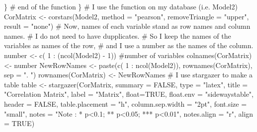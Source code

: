 \documentclass[12pt,]{article}
\newenvironment{Shaded}{}{}
\newcommand{\KeywordTok}[1]{\textcolor[rgb]{0.00,0.00,1.00}{#1}}
\newcommand{\DataTypeTok}[1]{#1}
\newcommand{\DecValTok}[1]{#1}
\newcommand{\StringTok}[1]{\textcolor[rgb]{0.00,0.50,0.50}{#1}}
\newcommand{\CommentTok}[1]{\textcolor[rgb]{0.00,0.50,0.00}{#1}}
\newcommand{\OtherTok}[1]{\textcolor[rgb]{1.00,0.25,0.00}{#1}}
\newcommand{\OperatorTok}[1]{#1}
\newcommand{\NormalTok}[1]{#1}
\begin{document}
\begin{Shaded}
\begin{Highlighting}[]
\NormalTok{    \}}
  \CommentTok{# end of the function}
\NormalTok{  \} }
\CommentTok{# I use the function on my database (i.e. Model2)}
\NormalTok{CorMatrix <-}\StringTok{ }\KeywordTok{corstars}\NormalTok{(Model2, }
                      \DataTypeTok{method =} \StringTok{"pearson"}\NormalTok{, }
                      \DataTypeTok{removeTriangle =} \StringTok{"upper"}\NormalTok{,  }
                      \DataTypeTok{result =} \StringTok{"none"}\NormalTok{)}
\CommentTok{# Now, names of each variable stand as row names and column names. }
\CommentTok{# I do not need to have dupplicates. }
\CommentTok{# So I keep the names of the variables as names of the row,}
\CommentTok{# and I use a number as the names of the column.}
\NormalTok{number <-}\StringTok{ }\KeywordTok{c}\NormalTok{( }\DecValTok{1} \OperatorTok{:}\StringTok{ }\NormalTok{(}\KeywordTok{ncol}\NormalTok{(Model2) }\OperatorTok{-}\StringTok{ }\DecValTok{1}\NormalTok{)) }\CommentTok{#number of variables}
\KeywordTok{colnames}\NormalTok{(CorMatrix) <-}\StringTok{ }\NormalTok{number}
\NormalTok{NewRowNames <-}\StringTok{ }\KeywordTok{paste}\NormalTok{(}\KeywordTok{c}\NormalTok{( }\DecValTok{1} \OperatorTok{:}\StringTok{ }\KeywordTok{ncol}\NormalTok{(Model2)),}
                     \KeywordTok{rownames}\NormalTok{(CorMatrix), }
                     \DataTypeTok{sep =} \StringTok{". "}\NormalTok{)}
\KeywordTok{rownames}\NormalTok{(CorMatrix) <-}\StringTok{ }\NormalTok{NewRowNames}
\CommentTok{# I use stargazer to make a table}
\NormalTok{table <-}\StringTok{ }\KeywordTok{stargazer}\NormalTok{(CorMatrix, }
                   \DataTypeTok{summary =} \OtherTok{FALSE}\NormalTok{, }
                   \DataTypeTok{type =} \StringTok{"latex"}\NormalTok{, }
                   \DataTypeTok{title =} \StringTok{"Correlation Matrix"}\NormalTok{, }
                   \DataTypeTok{label =} \StringTok{"Matrix"}\NormalTok{, }
                   \DataTypeTok{float=}\OtherTok{TRUE}\NormalTok{, }
                   \DataTypeTok{float.env =} \StringTok{"sidewaystable"}\NormalTok{, }
                   \DataTypeTok{header =} \OtherTok{FALSE}\NormalTok{, }
                   \DataTypeTok{table.placement =} \StringTok{"h"}\NormalTok{, }
                   \DataTypeTok{column.sep.width =} \StringTok{"2pt"}\NormalTok{, }
                   \DataTypeTok{font.size =} \StringTok{"small"}\NormalTok{, }
                   \DataTypeTok{notes =} \StringTok{"Note : * p<0.1; ** p<0.05; *** p<0.01"}\NormalTok{, }
                   \DataTypeTok{notes.align =} \StringTok{"r"}\NormalTok{, }
                   \DataTypeTok{align =} \OtherTok{TRUE}\NormalTok{)}
\end{Highlighting}
\end{Shaded}
\end{document}
